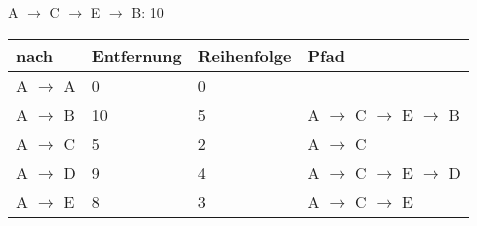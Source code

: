 \documentclass{bschlangaul-aufgabe}
\begin{document}
\begin{enumerate}
\begin{bAntwort}
A $\rightarrow$ C $\rightarrow$ E $\rightarrow$ B: 10

\begin{tabular}{llll}
\bf{nach}                                         & \bf{Entfernung}                                   & \bf{Reihenfolge}                                  & \bf{Pfad}                                         \\
\hline
A  $\rightarrow$  A                               & 0                                                 & 0                                                 &                                                   \\
A  $\rightarrow$  B                               & 10                                                & 5                                                 & A $\rightarrow$ C $\rightarrow$ E $\rightarrow$ B \\
A  $\rightarrow$  C                               & 5                                                 & 2                                                 & A $\rightarrow$ C                                 \\
A  $\rightarrow$  D                               & 9                                                 & 4                                                 & A $\rightarrow$ C $\rightarrow$ E $\rightarrow$ D \\
A  $\rightarrow$  E                               & 8                                                 & 3                                                 & A $\rightarrow$ C $\rightarrow$ E                 \\
\end{tabular}

\end{bAntwort}
\end{enumerate}
\end{document}
